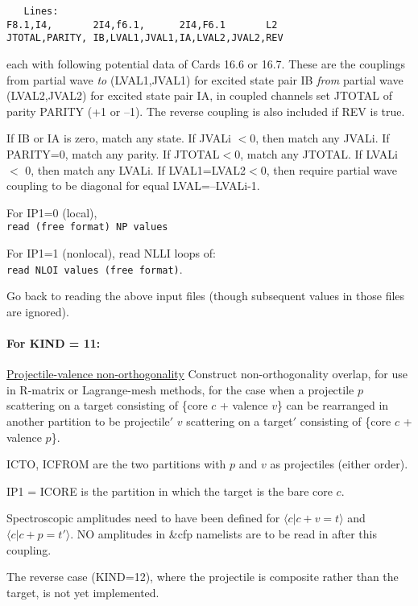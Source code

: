 \documentclass[11pt]{article}
\begin{document}
\begin{description}
\begin{verbatim}
   Lines:
F8.1,I4,       2I4,f6.1,      2I4,F6.1       L2
JTOTAL,PARITY, IB,LVAL1,JVAL1,IA,LVAL2,JVAL2,REV
\end{verbatim}
each with following potential data of Cards 16.6 or 16.7.
These are the couplings from partial wave {\em to}  (LVAL1,JVAL1) for excited state pair IB
{\em from} partial wave (LVAL2,JVAL2) for excited state pair IA, in coupled channels set JTOTAL of parity PARITY (+1 or --1). 
The reverse coupling is also included if REV is true.

If IB or IA is zero, match any state. If JVALi $< $0, then match any JVALi. If PARITY=0, match any parity.
If JTOTAL$<$0, match any JTOTAL.  If LVALi $<$ 0, then match any LVALi.
If LVAL1=LVAL2$<$0, then require partial wave coupling to be diagonal for equal LVAL=--LVALi-1.


For IP1=0 (local), \\
  \hspace*{8mm} {\tt read (free format) NP values}

For IP1=1 (nonlocal), read NLLI loops of:\\
      \hspace*{8mm} {\tt read NLOI values (free format)}.

Go back to reading the above input files (though subsequent values in those files are ignored).


\paragraph{For KIND = 11:}
\underline{Projectile-valence non-orthogonality}
Construct non-orthogonality overlap, for use in R-matrix or Lagrange-mesh methods,  for the case when a 
projectile $p$ scattering on a target consisting of \{core $c$ + valence $v$\} can be rearranged in another partition 
to be projectile$'$ $v$ scattering on a target$'$ consisting of \{core $c$ + valence $p$\}.

\noindent
ICTO, ICFROM are the two partitions with $p$ and $v$ as projectiles (either order).

\noindent
IP1 = ICORE is the partition in which the target is the bare  core  $c$.

Spectroscopic amplitudes need to have been defined for $\langle c | c+v = t \rangle$  and $\langle c | c+p = t'  \rangle$. 
NO amplitudes in \&cfp namelists are to be read in after this coupling.

The reverse case (KIND=12), where the projectile is composite rather than the target, is not yet implemented.
\end{description}
\end{document}
